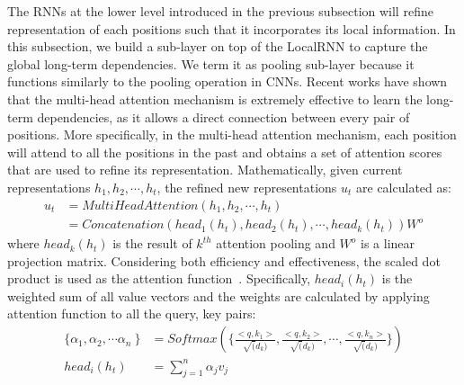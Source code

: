 \documentclass{article} \usepackage{iclr2019_conference,times}
\begin{document}
The RNNs at the lower level introduced in the previous subsection will refine representation of each positions such that it incorporates its local information. In this subsection, we build a sub-layer on top of the LocalRNN to capture the global long-term dependencies. We term it as pooling sub-layer because it functions similarly to the pooling operation in CNNs. Recent works have shown that the multi-head attention mechanism is extremely effective to learn the long-term dependencies, as it allows a direct connection between every pair of positions. More specifically, in the multi-head attention mechanism, each position will attend to all the positions in the past and obtains a set of attention scores that are used to refine its representation. Mathematically, given current representations $h_1, h_2, \cdots, h_t$, the refined new representations $u_t$ are calculated as:
 \begin{align}
 u_t &= MultiHeadAttention(h_1, h_2, \cdots, h_t)  \\ \nonumber
 	&= Concatenation(head_1(h_t), head_2(h_t), \cdots, head_k(h_t)) W^o \nonumber
 \end{align}
\noindent where $head_k(h_t)$ is the result of $k^{th}$ attention pooling and $W^o$ is a linear projection matrix. Considering both efficiency and effectiveness, the scaled dot product is used as the attention function~\citep{vaswani2017attention}. Specifically, $head_i(h_t)$ is the weighted sum of all value vectors and the weights are calculated by applying attention function to all the query, key pairs:
\begin{align}
\label{eq:attn}
\{\alpha_1, \alpha_2, \cdots \alpha_n\ \} &= Softmax( \{ \frac{<q, k_1>}{\sqrt(d_k)}, \frac{<q, k_2>}{\sqrt(d_k)}, \cdots, \frac{<q, k_n>}{\sqrt(d_k)} \}) \\ \nonumber
head_i(h_t) &= \sum^{n}_{j=1} \alpha_j v_j
\end{align}
\end{document}
